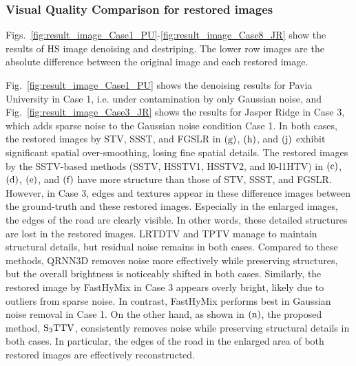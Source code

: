 



\subsubsection{Visual Quality Comparison for restored images}
Figs.~\ref{fig:result_image_Case1_PU}-\ref{fig:result_image_Case8_JR} show the results of HS image denoising and destriping.
The lower row images are the absolute difference between the original image and each restored image.


Fig.~\ref{fig:result_image_Case1_PU} shows the denoising results for Pavia University in Case 1, i.e. under contamination by only Gaussian noise, and Fig.~\ref{fig:result_image_Case3_JR} shows the results for Jasper Ridge in Case 3, which adds sparse noise to the Gaussian noise condition Case 1.
In both cases, the restored images by STV, SSST, and FGSLR in $\text{(g)}$, $\text{(h)}$, and $\text{(j)}$ exhibit significant spatial over-smoothing, losing fine spatial details. The restored images by the SSTV-based methods (SSTV, HSSTV1, HSSTV2, and l0-l1HTV) in $\text{(c)}$, $\text{(d)}$, $\text{(e)}$, and $\text{(f)}$ have more structure than those of STV, SSST, and FGSLR. However, in Case 3, edges and textures appear in these difference images between the ground-truth and these restored images. Especially in the enlarged images, the edges of the road are clearly visible. In other words, these detailed structures are lost in the restored images. LRTDTV and TPTV manage to maintain structural details, but residual noise remains in both cases. Compared to these methods, QRNN3D removes noise more effectively while preserving structures, but the overall brightness is noticeably shifted in both cases. Similarly, the restored image by FastHyMix in Case 3 appears overly bright, likely due to outliers from sparse noise. In contrast, FastHyMix performs best in Gaussian noise removal in Case 1. On the other hand, as shown in $\text{(n)}$, the proposed method, ${\text{S}_{3} \text{TTV}}$, consistently removes noise while preserving structural details in both cases. In particular, the edges of the road in the enlarged area of both restored images are effectively reconstructed.



